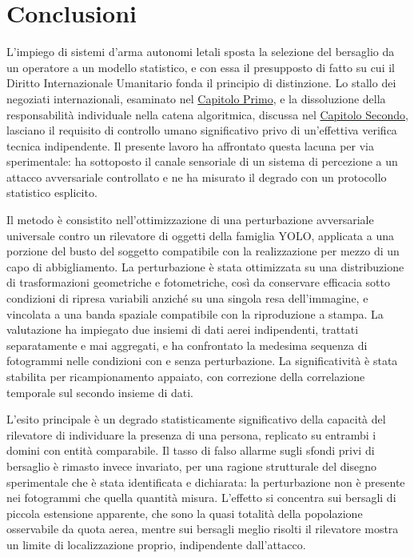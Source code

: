 \documentclass[a4paper,12pt]{report}
\begin{document}
\chapter{Conclusioni}
\label{cap6}

L'impiego di sistemi d'arma autonomi letali sposta la selezione del bersaglio da un operatore a un modello statistico, e con essa il presupposto di fatto su cui il Diritto Internazionale Umanitario fonda il principio di distinzione. Lo stallo dei negoziati internazionali, esaminato nel \hyperref[cap1]{Capitolo Primo}, e la dissoluzione della responsabilità individuale nella catena algoritmica, discussa nel \hyperref[cap2]{Capitolo Secondo}, lasciano il requisito di controllo umano significativo privo di un'effettiva verifica tecnica indipendente. Il presente lavoro ha affrontato questa lacuna per via sperimentale: ha sottoposto il canale sensoriale di un sistema di percezione a un attacco avversariale controllato e ne ha misurato il degrado con un protocollo statistico esplicito.

Il metodo è consistito nell'ottimizzazione di una perturbazione avversariale universale contro un rilevatore di oggetti della famiglia YOLO, applicata a una porzione del busto del soggetto compatibile con la realizzazione per mezzo di un capo di abbigliamento. La perturbazione è stata ottimizzata su una distribuzione di trasformazioni geometriche e fotometriche, così da conservare efficacia sotto condizioni di ripresa variabili anziché su una singola resa dell'immagine, e vincolata a una banda spaziale compatibile con la riproduzione a stampa. La valutazione ha impiegato due insiemi di dati aerei indipendenti, trattati separatamente e mai aggregati, e ha confrontato la medesima sequenza di fotogrammi nelle condizioni con e senza perturbazione. La significatività è stata stabilita per ricampionamento appaiato, con correzione della correlazione temporale sul secondo insieme di dati.

L'esito principale è un degrado statisticamente significativo della capacità del rilevatore di individuare la presenza di una persona, replicato su entrambi i domini con entità comparabile. Il tasso di falso allarme sugli sfondi privi di bersaglio è rimasto invece invariato, per una ragione strutturale del disegno sperimentale che è stata identificata e dichiarata: la perturbazione non è presente nei fotogrammi che quella quantità misura. L'effetto si concentra sui bersagli di piccola estensione apparente, che sono la quasi totalità della popolazione osservabile da quota aerea, mentre sui bersagli meglio risolti il rilevatore mostra un limite di localizzazione proprio, indipendente dall'attacco.
\end{document}
